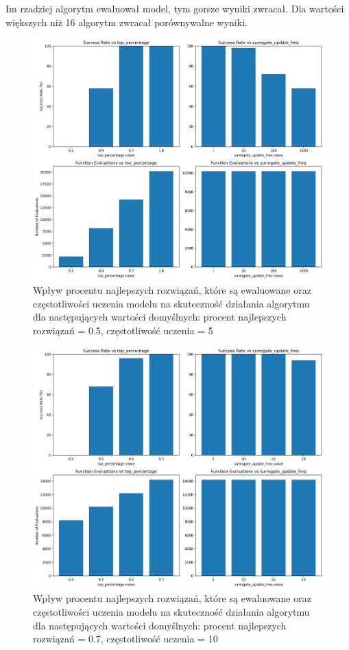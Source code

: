 \documentclass{article}
\begin{document}
Im rzadziej algorytm ewaluował model, tym gorsze wyniki zwracał. Dla wartości większych niż 16 algorytm zwracał porównywalne wyniki.

\begin{figure}[H]
    \centering
    \includegraphics[width=\textwidth]{surrogate_de_parameter_tuning_results1.png}
    \caption{Wpływ procentu najlepszych rozwiązań, które są ewaluowane oraz częstotliwości uczenia modelu na skuteczność działania algorytmu dla następujących wartości domyślnych: procent najlepszych rozwiązań = 0.5, częstotliwość uczenia = 5}
    \label{fig:surogate_de_parameter_results1}
\end{figure}

\begin{figure}[H]
    \centering
    \includegraphics[width=\textwidth]{surrogate_de_parameter_tuning_results2.png}
    \caption{Wpływ procentu najlepszych rozwiązań, które są ewaluowane oraz częstotliwości uczenia modelu na skuteczność działania algorytmu dla następujących wartości domyślnych: procent najlepszych rozwiązań = 0.7, częstotliwość uczenia = 10}
    \label{fig:surogate_de_parameter_results2}
\end{figure}
\end{document}
